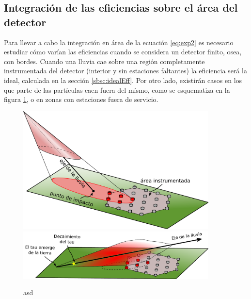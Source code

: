 	\subsection{Integración de las eficiencias sobre el área del detector}
	
	Para llevar a cabo la integración en área de la ecuación \ref{eq:exp2} es necesario estudiar cómo varían las eficiencias cuando se considera un detector finito, osea, con bordes.
	Cuando una lluvia cae sobre una región completamente instrumentada del detector (interior y sin estaciones faltantes) la eficiencia será la ideal, calculada en la sección \ref{sbsc:idealEff}.
	Por otro lado, existirán casos en los que parte de las partículas caen fuera del mísmo, como se esquematiza en la figura \ref{fig:lluviaFuera}, o en zonas con estaciones fuera de servicio.
	\begin{figure}[h!]
		\begin{center}
			\includegraphics[width=0.9\textwidth]{fig/resultadosAuger/lluviaFuera}\\
			\vspace*{0.1\textwidth}
			\includegraphics[width=0.9\textwidth]{fig/resultadosAuger/lluviaFuera_ES}
			\caption{asd}
			\label{fig:lluviaFuera}
		\end{center}
	\end{figure}
	
